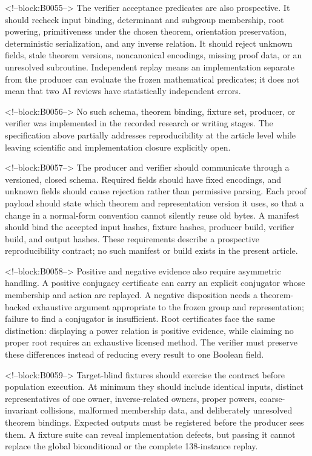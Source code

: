 \documentclass[11pt]{article}
\begin{document}
<!--block:B0055-->
The verifier acceptance predicates are also prospective. It should
recheck input binding, determinant and subgroup membership, root
powering, primitiveness under the chosen theorem, orientation
preservation, deterministic serialization, and any inverse relation. It
should reject unknown fields, stale theorem versions, noncanonical
encodings, missing proof data, or an unresolved subroutine. Independent
replay means an implementation separate from the producer can evaluate
the frozen mathematical predicates; it does not mean that two AI reviews
have statistically independent errors.

<!--block:B0056-->
No such schema, theorem binding, fixture set, producer, or verifier was
implemented in the recorded research or writing stages. The specification above partially addresses
reproducibility at the article level while leaving scientific and
implementation closure explicitly open.

<!--block:B0057-->
The producer and verifier should communicate through a versioned,
closed schema. Required fields should have fixed encodings, and unknown
fields should cause rejection rather than permissive parsing. Each proof
payload should state which theorem and representation version it uses,
so that a change in a normal-form convention cannot silently reuse old
bytes. A manifest should bind the accepted input hashes, fixture hashes,
producer build, verifier build, and output hashes. These requirements
describe a prospective reproducibility contract; no such manifest or
build exists in the present article.

<!--block:B0058-->
Positive and negative evidence also require asymmetric handling. A
positive conjugacy certificate can carry an explicit conjugator whose
membership and action are replayed. A negative disposition needs a
theorem-backed exhaustive argument appropriate to the frozen group and
representation; failure to find a conjugator is insufficient. Root
certificates face the same distinction: displaying a power relation is
positive evidence, while claiming no proper root requires an exhaustive
licensed method. The verifier must preserve these differences instead
of reducing every result to one Boolean field.

<!--block:B0059-->
Target-blind fixtures should exercise the contract before population
execution. At minimum they should include identical inputs, distinct
representatives of one owner, inverse-related owners, proper powers,
coarse-invariant collisions, malformed membership data, and deliberately
unresolved theorem bindings. Expected outputs must be registered before
the producer sees them. A fixture suite can reveal implementation
defects, but passing it cannot replace the global biconditional or the
complete 138-instance replay.
\end{document}
